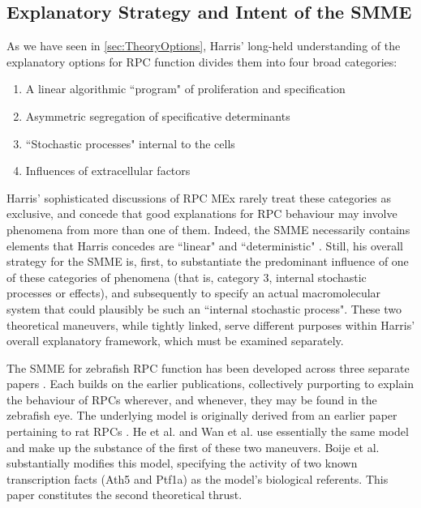 \documentclass{ut-thesis}
\begin{document}
\begin{NoHyper}
\section{Explanatory Strategy and Intent of the SMME}
\label{sec:SMMEexplanatorystrat}
As we have seen in \autoref{sec:TheoryOptions}, Harris' long-held understanding of the explanatory options for RPC function divides them into four broad categories:

\begin{enumerate}
\item A linear algorithmic ``program" of proliferation and specification
\item Asymmetric segregation of specificative determinants
\item ``Stochastic processes" internal to the cells
\item Influences of extracellular factors
\end{enumerate}

Harris' sophisticated discussions of RPC MEx rarely treat these categories as exclusive, and concede that good explanations for RPC behaviour may involve phenomena from more than one of them. Indeed, the SMME necessarily contains elements that Harris concedes are ``linear" and ``deterministic" \cite{He2012}. Still, his overall strategy for the SMME is, first, to substantiate the predominant influence of one of these categories of phenomena (that is, category 3, internal stochastic processes or effects), and subsequently to specify an actual macromolecular system that could plausibly be such an ``internal stochastic process". These two theoretical maneuvers, while tightly linked, serve different purposes within Harris' overall explanatory framework, which must be examined separately.

The SMME for zebrafish RPC function has been developed across three separate papers \cite{He2012,Boije2015,Wan2016}. Each builds on the earlier publications, collectively purporting to explain the behaviour of RPCs wherever, and whenever, they may be found in the zebrafish eye. The underlying model is originally derived from an earlier paper pertaining to rat RPCs \cite{Gomes2011}. He et al. \cite{He2012} and Wan et al. \cite{Wan2016} use essentially the same model and make up the substance of the first of these two maneuvers. Boije et al. \cite{Boije2015} substantially modifies this model, specifying the activity of two known transcription facts (Ath5 and Ptf1a) as the model's biological referents. This paper constitutes the second theoretical thrust.


\end{NoHyper}
\end{document}

